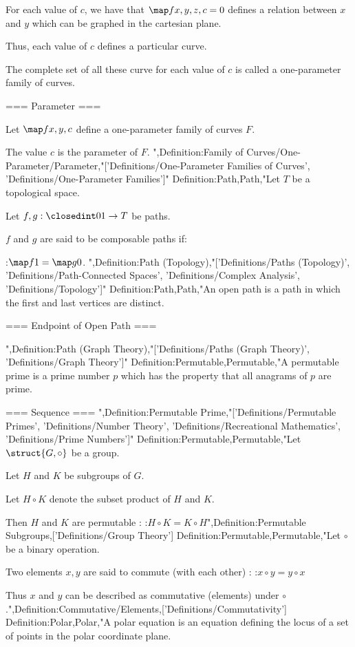 For each value of $c$, we have that $\map f {x, y, z, c} = 0$ defines a relation between $x$ and $y$ which can be graphed in the cartesian plane.

Thus, each value of $c$ defines a particular curve.


The complete set of all these curve for each value of $c$ is called a one-parameter family of curves.


=== Parameter ===

Let $\map f {x, y, c}$ define a one-parameter family of curves $F$.

The value $c$ is the parameter of $F$.
",Definition:Family of Curves/One-Parameter/Parameter,"['Definitions/One-Parameter Families of Curves', 'Definitions/One-Parameter Families']"
Definition:Path,Path,"Let $T$ be a topological space.

Let $f, g: \closedint 0 1 \to T$ be paths.


$f$ and $g$ are said to be composable paths if:

:$\map f 1 = \map g 0$.
",Definition:Path (Topology),"['Definitions/Paths (Topology)', 'Definitions/Path-Connected Spaces', 'Definitions/Complex Analysis', 'Definitions/Topology']"
Definition:Path,Path,"An open path is a path in which the first and last vertices are distinct.



=== Endpoint of Open Path ===

",Definition:Path (Graph Theory),"['Definitions/Paths (Graph Theory)', 'Definitions/Graph Theory']"
Definition:Permutable,Permutable,"A permutable prime is a prime number $p$ which has the property that all anagrams of $p$ are prime.


=== Sequence ===
",Definition:Permutable Prime,"['Definitions/Permutable Primes', 'Definitions/Number Theory', 'Definitions/Recreational Mathematics', 'Definitions/Prime Numbers']"
Definition:Permutable,Permutable,"Let $\struct {G, \circ}$ be a group.

Let $H$ and $K$ be subgroups of $G$.

Let $H \circ K$ denote the subset product of $H$ and $K$.


Then $H$ and $K$ are permutable :
:$H \circ K = K \circ H$",Definition:Permutable Subgroups,['Definitions/Group Theory']
Definition:Permutable,Permutable,"Let $\circ$ be a binary operation.


Two elements $x, y$ are said to commute (with each other) :
:$x \circ y = y \circ x$


Thus $x$ and $y$ can be described as commutative (elements) under $\circ$.",Definition:Commutative/Elements,['Definitions/Commutativity']
Definition:Polar,Polar,"A polar equation is an equation defining the locus of a set of points in the polar coordinate plane.

